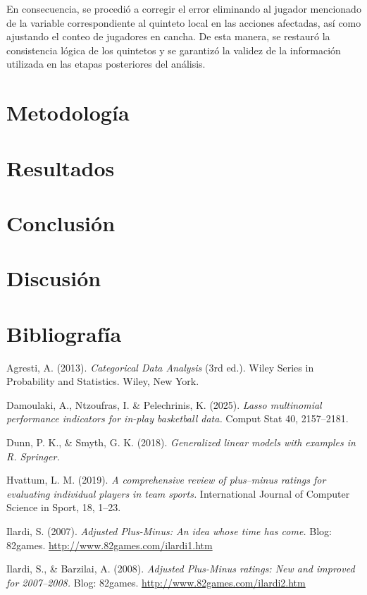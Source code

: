 \documentclass[
]{article}
\begin{document}
En consecuencia, se procedió a corregir el error eliminando al jugador
mencionado de la variable correspondiente al quinteto local en las
acciones afectadas, así como ajustando el conteo de jugadores en cancha.
De esta manera, se restauró la consistencia lógica de los quintetos y se
garantizó la validez de la información utilizada en las etapas
posteriores del análisis.

\section{Metodología}\label{metodologuxeda}

\section{Resultados}\label{resultados}

\section{Conclusión}\label{conclusiuxf3n}

\section{Discusión}\label{discusiuxf3n}

\newpage

\section{Bibliografía}\label{bibliografuxeda}

Agresti, A. (2013). \emph{Categorical Data Analysis} (3rd ed.). Wiley
Series in Probability and Statistics. Wiley, New York.

Damoulaki, A., Ntzoufras, I. \& Pelechrinis, K. (2025). \emph{Lasso
multinomial performance indicators for in-play basketball data.} Comput
Stat 40, 2157--2181.

Dunn, P. K., \& Smyth, G. K. (2018). \emph{Generalized linear models
with examples in R. Springer.}

Hvattum, L. M. (2019). \emph{A comprehensive review of plus--minus
ratings for evaluating individual players in team sports.} International
Journal of Computer Science in Sport, 18, 1--23.

Ilardi, S. (2007). \emph{Adjusted Plus-Minus: An idea whose time has
come.} Blog: 82games. \url{http://www.82games.com/ilardi1.htm}

Ilardi, S., \& Barzilai, A. (2008). \emph{Adjusted Plus-Minus ratings:
New and improved for 2007--2008.} Blog: 82games.
\url{http://www.82games.com/ilardi2.htm}
\end{document}
